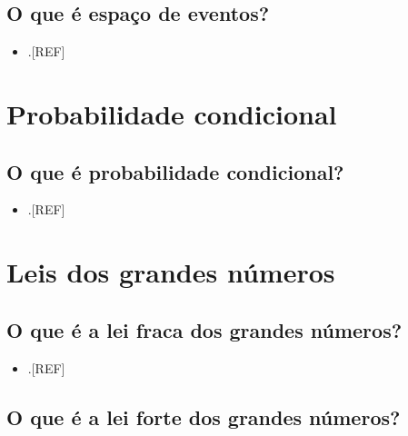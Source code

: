 \documentclass[
]{book}
\providecommand{\tightlist}{%
  \setlength{\itemsep}{0pt}\setlength{\parskip}{0pt}}
\begin{document}
\hypertarget{o-que-uxe9-espauxe7o-de-eventos}{%
\subsection{O que é espaço de eventos?}\label{o-que-uxe9-espauxe7o-de-eventos}}

\begin{itemize}
\tightlist
\item
  .{[}REF{]}
\end{itemize}

\hypertarget{probabilidade-ciondicional}{%
\section{Probabilidade condicional}\label{probabilidade-ciondicional}}

\hypertarget{o-que-uxe9-probabilidade-condicional}{%
\subsection{O que é probabilidade condicional?}\label{o-que-uxe9-probabilidade-condicional}}

\begin{itemize}
\tightlist
\item
  .{[}REF{]}
\end{itemize}

\hypertarget{lei-grandes-numeros}{%
\section{Leis dos grandes números}\label{lei-grandes-numeros}}

\hypertarget{o-que-uxe9-a-lei-fraca-dos-grandes-nuxfameros}{%
\subsection{O que é a lei fraca dos grandes números?}\label{o-que-uxe9-a-lei-fraca-dos-grandes-nuxfameros}}

\begin{itemize}
\tightlist
\item
  .{[}REF{]}
\end{itemize}

\hypertarget{o-que-uxe9-a-lei-forte-dos-grandes-nuxfameros}{%
\subsection{O que é a lei forte dos grandes números?}\label{o-que-uxe9-a-lei-forte-dos-grandes-nuxfameros}}
\end{document}
